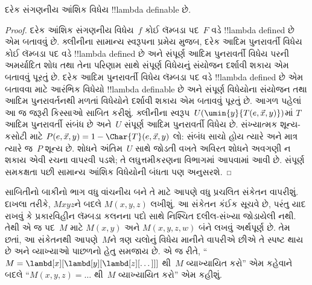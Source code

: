 \documentclass[../../../include/open-logic-section]{subfiles}
\begin{document}

\begin{thm}
દરેક સંગણનીય આંશિક વિધેય !!{lambda definable} છે.
\end{thm}

\begin{proof}
દરેક આંશિક સંગણનીય વિધેય~$f$ કોઈ લૅમ્બડા પદ~$F$ વડે
!!{lambda defined} છે એમ બતાવવું છે. ક્લીનીના સામાન્ય સ્વરૂપના
પ્રમેય મુજબ, દરેક આદિમ પુનરાવર્તી વિધેય કોઈ લૅમ્બડા પદ વડે
!!{lambda defined} છે અને સંપૂર્ણ આદિમ પુનરાવર્તી વિધેય પરની અમર્યાદિત
શોધ તથા તેના પરિણામ સાથે સંપૂર્ણ વિધેયનું સંયોજન દર્શાવી શકાય
એમ બતાવવું પૂરતું છે.
દરેક આદિમ પુનરાવર્તી વિધેય લૅમ્બડા પદ વડે !!{lambda defined}
છે એમ બતાવવા માટે આરંભિક વિધેયો !!{lambda definable} છે અને
સંપૂર્ણ વિધેયોના સંયોજન તથા આદિમ પુનરાવર્તનથી મળતાં વિધેયોને
દર્શાવી શકાય એમ બતાવવું પૂરતું છે. આગળ પહેલાં આ જ જરૂરી કિસ્સાઓ
સાબિત કરીશું. ક્લીનીના સ્વરૂપ~$U(\umin{y}{T(e,\vec x,y)})$માં
$T$ આદિમ પુનરાવર્તી સંબંધ છે અને~$U$ સંપૂર્ણ આદિમ પુનરાવર્તી
વિધેય છે. સંખ્યાત્મક શૂન્ય-કસોટી માટે
$P(e,\vec x,y)=1-\Char{T}(e,\vec x,y)$ લો: સંબંધ સાચો હોય
ત્યારે અને માત્ર ત્યારે જ~$P$ શૂન્ય છે. શોધને અંતિમ~$U$ સાથે
જોડતી વખતે અવિરત શોધને અવગણી ન શકાય એવી રચના વાપરવી પડશે;
તે લઘુત્તમીકરણના વિભાગમાં આપવામાં આવી છે. સંપૂર્ણ સમકક્ષતા
પછી સામાન્ય આંશિક વિધેયોની બંધતા પણ અનુસરશે.
\end{proof}

સાબિતીનો બાકીનો ભાગ વધુ વાંચનીય બને તે માટે આપણે વધુ પ્રચલિત
સંકેતન વાપરીશું. દાખલા તરીકે, $Mxyz$ને બદલે $M(x, y, z)$ લખીશું.
આ સંકેતન કંઈક સૂચવે છે, પરંતુ યાદ રાખવું કે પ્રકારવિહીન લૅમ્બડા
કલનના પદો સાથે નિશ્ચિત દલીલ-સંખ્યા જોડાયેલી નથી. તેથી એ જ
પદ~$M$ માટે $M(x,y)$ અને $M(x,y,z,w)$ બંને લખવું અર્થપૂર્ણ છે.
તેમ છતાં, આ સંકેતનથી આપણે~$M$ને ત્રણ ચલોનું વિધેય માનીને
વાપરીએ છીએ તે સ્પષ્ટ થાય છે અને વ્યાખ્યાઓ પાછળનો હેતુ સમજાય છે.
એ જ રીતે, ``$M = \lambd[x][\lambd[y][\lambd[z][\dots]]]$
થી~$M$ વ્યાખ્યાયિત કરો'' એમ કહેવાને બદલે ``$M(x,y,z) = \dots$
થી~$M$ વ્યાખ્યાયિત કરો'' એમ કહીશું.
\end{document}
